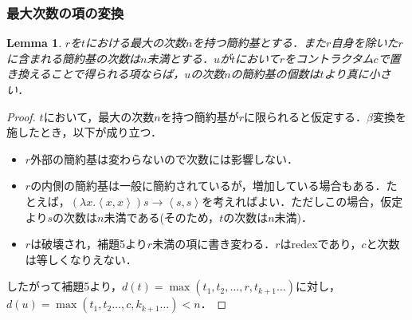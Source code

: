 \documentclass[a4paper,10pt,platex, dvipdfmx]{jsarticle}
\newtheorem{lemma}{Lemma}
\begin{document}
\subsubsection{最大次数の項の変換}
\begin{lemma}
$r$を$t$における最大の次数$n$を持つ簡約基とする．また$r$自身を除いた$r$に含まれる簡約基の次数は$n$未満とする．$u$が$t$において$r$をコントラクタム$c$で置き換えることで得られる項ならば，$u$の次数$n$の簡約基の個数は$t$より真に小さい．
\end{lemma}
\begin{proof}
    $t$において，最大の次数$n$を持つ簡約基が$r$に限られると仮定する．$\beta$変換を施したとき，以下が成り立つ．
    \begin{itemize}    
    \item $r$外部の簡約基は変わらないので次数には影響しない．
    \item $r$の内側の簡約基は一般に簡約されているが，増加している場合もある．たとえば，$(\lambda x. \left<x, x\right>) s \rightarrow \left<s, s\right>$を考えればよい．ただしこの場合，仮定より$s$の次数は$n$未満である(そのため，$t$の次数は$n$未満)．
    \item $r$は破壊され，補題5より$r$未満の項に書き変わる．$r$はredexであり，$c$と次数は等しくなりえない．
    \end{itemize}
    したがって補題5より，$d(t) = \max(t_{1},t_{2},\ldots ,r,t_{k+1}\ldots)$に対し， $d(u) = \max(t_{1},t_{2}\ldots,c,k_{k + 1}\ldots) < n$．
\end{proof}
\end{document}
